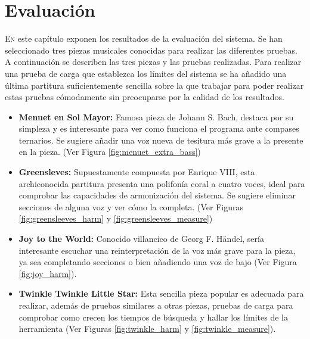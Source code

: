 \chapter{Evaluación}
\label{chap:evaluation}
\vspace{0.5cm}


 \lettrine{E}{n} este capítulo exponen los resultados de la evaluación del sistema. Se han seleccionado tres piezas musicales conocidas para realizar las diferentes pruebas. A continuación se describen las tres piezas y las pruebas realizadas. Para realizar una prueba de carga que establezca los límites del sistema se ha añadido una última partitura suficientemente sencilla sobre la que trabajar para poder realizar estas pruebas cómodamente sin preocuparse por la calidad de los resultados.
 
 \begin{itemize}
 	\item \textbf{Menuet en Sol Mayor:} Famosa pieza de Johann S. Bach, destaca por su simpleza y es interesante para ver como funciona el programa ante compases ternarios. Se sugiere añadir una voz nueva de tesitura más grave a la presente en la pieza. (Ver Figura \ref{fig:menuet_extra_bass})
 	\item \textbf{Greensleves:} Supuestamente compuesta por Enrique VIII, esta archiconocida partitura presenta una polifonía coral a cuatro voces, ideal para comprobar las capacidades de armonización del sistema. Se sugiere eliminar secciones de alguna voz y ver cómo la completa. (Ver Figuras \ref{fig:greensleeves_harm} y \ref{fig:greensleeves_measure})
 	\item \textbf{Joy to the World:} Conocido villancico de Georg F. Händel, sería interesante escuchar una reinterpretación de la voz más grave para la pieza, ya sea completando secciones o bien añadiendo una voz de bajo (Ver Figura \ref{fig:joy_harm}).
    \item \textbf{Twinkle Twinkle Little Star:} Esta sencilla pieza popular es adecuada para realizar, además de pruebas similares a otras piezas, pruebas de carga para comprobar como crecen los tiempos de búsqueda y hallar los límites de la herramienta (Ver Figuras \ref{fig:twinkle_harm} y \ref{fig:twinkle_measure}).
 \end{itemize}
 
